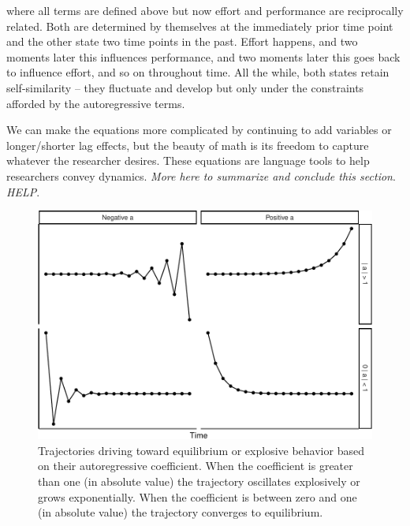 \documentclass[english,,man]{apa6}
\theoremstyle{definition}
\theoremstyle{definition}
\theoremstyle{definition}
\theoremstyle{remark}
\begin{document}
\noindent where all terms are defined above but now effort and
performance are reciprocally related. Both are determined by themselves
at the immediately prior time point and the other state two time points
in the past. Effort happens, and two moments later this influences
performance, and two moments later this goes back to influence effort,
and so on throughout time. All the while, both states retain
self-similarity -- they fluctuate and develop but only under the
constraints afforded by the autoregressive terms.

We can make the equations more complicated by continuing to add
variables or longer/shorter lag effects, but the beauty of math is its
freedom to capture whatever the researcher desires. These equations are
language tools to help researchers convey dynamics. \emph{More here to
summarize and conclude this section}. \emph{HELP}.

\begin{figure}
\centering
\includegraphics{figs/unnamed-chunk-9-1.pdf}
\caption{\label{fig:unnamed-chunk-9}Trajectories driving toward equilibrium
or explosive behavior based on their autoregressive coefficient. When
the coefficient is greater than one (in absolute value) the trajectory
oscillates explosively or grows exponentially. When the coefficient is
between zero and one (in absolute value) the trajectory converges to
equilibrium.\label{dynamics_plot}}
\end{figure}
\end{document}
